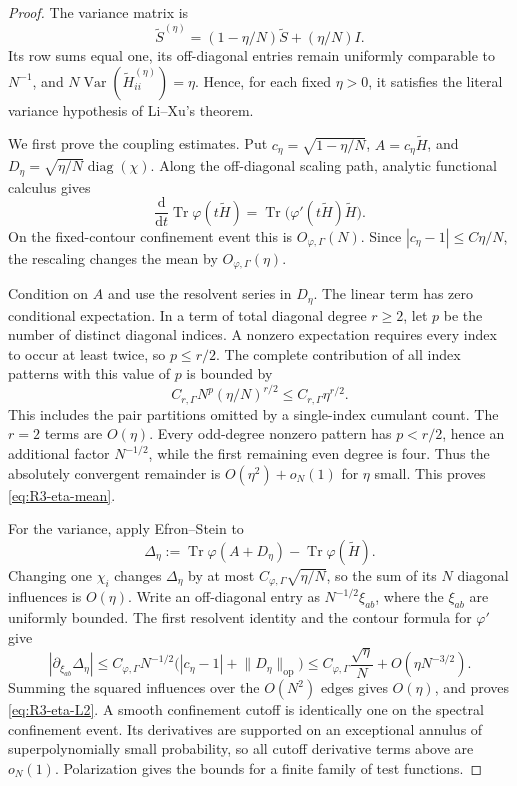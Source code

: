 \documentclass[11pt]{article}
\theoremstyle{definition}
\theoremstyle{remark}
\newcommand{\Var}{\operatorname{Var}}
\newcommand{\Tr}{\operatorname{Tr}}
\newcommand{\diag}{\operatorname{diag}}
\newcommand{\dd}{\mathrm d}
\newcommand{\op}{\mathrm{op}}
\newcommand{\norm}[1]{\lVert #1\rVert}
\begin{document}
\begin{proof}
The variance matrix is
\begin{equation}\label{eq:R3-eta-profile}
 \widetilde S^{(\eta)}
 =(1-\eta/N)\widetilde S+(\eta/N)I.
\end{equation}
Its row sums equal one, its off-diagonal entries remain uniformly comparable
to \(N^{-1}\), and
\(N\Var(\widetilde H^{(\eta)}_{ii})=\eta\).  Hence, for each fixed
\(\eta>0\), it satisfies the literal variance hypothesis of Li--Xu's theorem.

We first prove the coupling estimates.  Put
\(c_\eta=\sqrt{1-\eta/N}\), \(A=c_\eta\widetilde H\), and
\(D_\eta=\sqrt{\eta/N}\diag(\chi)\).  Along the off-diagonal scaling path,
analytic functional calculus gives
\[
 \frac{\dd}{\dd t}\Tr\varphi(t\widetilde H)
 =\Tr\bigl(\varphi'(t\widetilde H)\widetilde H\bigr).
\]
On the fixed-contour confinement event this is \(O_{\varphi,\Gamma}(N)\).
Since \(|c_\eta-1|\le C\eta/N\), the rescaling changes the mean by
\(O_{\varphi,\Gamma}(\eta)\).

Condition on \(A\) and use the resolvent series in \(D_\eta\).  The linear
term has zero conditional expectation.  In a term of total diagonal degree
\(r\ge2\), let \(p\) be the number of distinct diagonal indices.  A nonzero
expectation requires every index to occur at least twice, so \(p\le r/2\).
The complete contribution of all index patterns with this value of \(p\) is
bounded by
\[
 C_{r,\Gamma}N^p(\eta/N)^{r/2}
 \le C_{r,\Gamma}\eta^{r/2}.
\]
This includes the pair partitions omitted by a single-index cumulant count.
The \(r=2\) terms are \(O(\eta)\).  Every odd-degree nonzero pattern has
\(p<r/2\), hence an additional factor \(N^{-1/2}\), while the first
remaining even degree is four.  Thus the absolutely convergent remainder is
\(O(\eta^2)+o_N(1)\) for \(\eta\) small.  This proves
\eqref{eq:R3-eta-mean}.

For the variance, apply Efron--Stein to
\[
 \Delta_\eta
 :=\Tr\varphi(A+D_\eta)-\Tr\varphi(\widetilde H).
\]
Changing one \(\chi_i\) changes \(\Delta_\eta\) by at most
\(C_{\varphi,\Gamma}\sqrt{\eta/N}\), so the sum of its \(N\) diagonal
influences is \(O(\eta)\).  Write an off-diagonal entry as
\(N^{-1/2}\xi_{ab}\), where the \(\xi_{ab}\) are uniformly bounded.  The
first resolvent identity and the contour formula for \(\varphi'\) give
\[
 |\partial_{\xi_{ab}}\Delta_\eta|
 \le C_{\varphi,\Gamma}N^{-1/2}
 \bigl(|c_\eta-1|+\norm{D_\eta}_{\op}\bigr)
 \le C_{\varphi,\Gamma}\frac{\sqrt\eta}{N}
    +O(\eta N^{-3/2}).
\]
Summing the squared influences over the \(O(N^2)\) edges gives \(O(\eta)\),
and proves \eqref{eq:R3-eta-L2}.  A smooth confinement cutoff is identically
one on the spectral confinement event.  Its derivatives are supported on an
exceptional annulus of superpolynomially small probability, so all cutoff
derivative terms above are \(o_N(1)\).  Polarization gives the bounds for a
finite family of test functions.


\end{proof}
\end{document}
